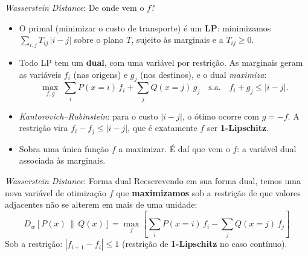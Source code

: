 \documentclass[aspectratio=169,xcolor=dvipsnames]{beamer}
\begin{document}
  \begin{frame}{\textit{Wasserstein Distance}: De onde vem o $f$?}
    \begin{itemize}
      \item O primal (minimizar o custo de transporte) é um \textbf{LP}: minimizamos
      $\sum_{i,j} T_{ij}\,|i-j|$ sobre o plano $T$, sujeito às marginais
      e a $T_{ij}\ge 0$.
      \item Todo LP tem um \textbf{dual}, com uma variável por restrição.
      As marginais geram as variáveis $f_i$ (nas origens) e $g_j$ (nos
      destinos), e o dual \emph{maximiza}:
      \[
        \max_{f,g}\;\sum_i P(x{=}i)\,f_i + \sum_j Q(x{=}j)\,g_j
        \quad\text{s.a.}\quad f_i + g_j \le |i-j|.
      \]
      \item \emph{Kantorovich--Rubinstein}: para o custo $|i-j|$, o ótimo
      ocorre com $g=-f$. A restrição vira $f_i - f_j \le |i-j|$, que é
      exatamente $f$ ser \textbf{1-Lipschitz}.
      \item Sobra uma única função $f$ a maximizar. É daí
      que vem o $f$: a variável dual associada às marginais.
    \end{itemize}
  \end{frame}

  \begin{frame}{\textit{Wasserstein Distance}: Forma dual}
    Reescrevendo em sua forma dual, temos uma nova variável de
    otimização $f$ que \textbf{maximizamos} sob a restrição de que
    valores adjacentes não se alterem em mais de uma unidade:
    \vspace{0.3em}
    \[
      D_{w}\!\left[P(x)\,\|\,Q(x)\right] =
      \max_{f}\!\left[\sum_{i} P(x=i)\,f_{i} - \sum_{j} Q(x=j)\,f_{j}\right]
    \]
    \vspace{0.3em}
    Sob a restrição: $|f_{i+1} - f_{i}| \le 1$
    (restrição de \textbf{1-Lipschitz} no caso contínuo).
  \end{frame}
\end{document}
